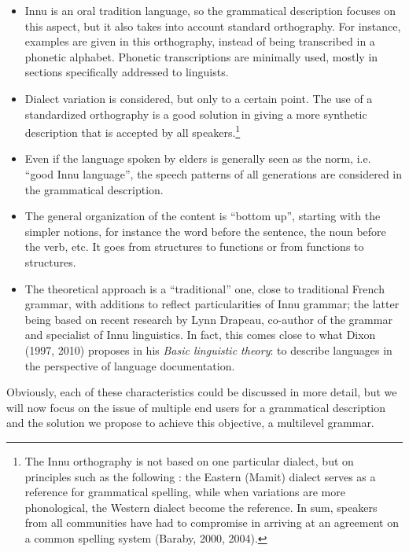 \documentclass[letterpaper]{article}
\begin{document}
\begin{itemize}
\item Innu is an oral tradition language, so the grammatical description focuses on this aspect, but it also takes into account standard orthography. For instance, examples are given in this orthography, instead of being transcribed in a phonetic alphabet. Phonetic transcriptions are minimally used, mostly in sections specifically addressed to lin\-guists.
\item Dialect variation is considered, but only to a certain point. The use of a standard\-ized orthography is a good solution in giving a more synthetic description that is accepted by all speakers.\footnote{ The Innu orthography is not based on one particular dialect, but on principles such as the following : the Eastern (Mamit) dialect serves as a reference for grammatical spelling, while when variations are more phonological, the Western dialect become the reference. In sum, speakers from all communities have had to compromise in arriving at an agreement on a common spelling system (Baraby, 2000, 2004).} 
\item Even if the language spoken by elders is generally seen as the norm, i.e. {\textquotedblleft}good Innu language{\textquotedblright}, the speech patterns of all generations are considered in the grammatical description.
\item The general organization of the content is {\textquotedblleft}bottom up{\textquotedblright}, starting with the simpler notions, for instance the word before the sentence, the noun before the verb, etc. It goes from structures to functions or from functions to structures.
\item The theoretical approach is a {\textquotedblleft}traditional{\textquotedblright} one, close to traditional French grammar, with additions to reflect particularities of Innu grammar; the latter being based on recent research by Lynn Drapeau, co-author of the grammar and specialist of Innu linguistics. In fact, this comes close to what Dixon (1997, 2010) proposes in his \textit{Basic linguistic theory}: to describe languages in the perspective of language documentation.
\end{itemize}
Obviously, each of these characteristics could be discussed in more detail, but we will now focus on the issue of multiple end users for a grammatical description and the solution we propose to achieve this objective, a multilevel grammar.
\end{document}
